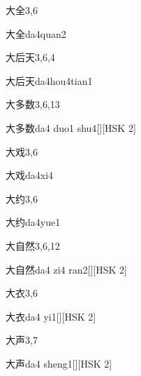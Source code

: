 \begin{entry}{大全}{3,6}
  \begin{phonetics}{大全}{da4quan2}
  \end{phonetics}
\end{entry}

\begin{entry}{大后天}{3,6,4}
  \begin{phonetics}{大后天}{da4hou4tian1}
  \end{phonetics}
\end{entry}

\begin{entry}{大多数}{3,6,13}
  \begin{phonetics}{大多数}{da4 duo1 shu4}[][HSK 2]
  \end{phonetics}
\end{entry}

\begin{entry}{大戏}{3,6}
  \begin{phonetics}{大戏}{da4xi4}
  \end{phonetics}
\end{entry}

\begin{entry}{大约}{3,6}
  \begin{phonetics}{大约}{da4yue1}
  \end{phonetics}
\end{entry}

\begin{entry}{大自然}{3,6,12}
  \begin{phonetics}{大自然}{da4 zi4 ran2}[][HSK 2]
  \end{phonetics}
\end{entry}

\begin{entry}{大衣}{3,6}
  \begin{phonetics}{大衣}{da4 yi1}[][HSK 2]
  \end{phonetics}
\end{entry}

\begin{entry}{大声}{3,7}
  \begin{phonetics}{大声}{da4 sheng1}[][HSK 2]
  \end{phonetics}
\end{entry}

